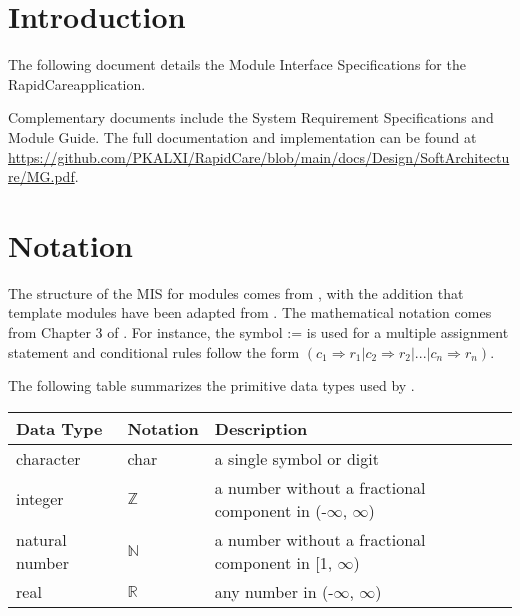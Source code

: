 \documentclass[12pt, titlepage]{article}
\newcommand{\projname}{RapidCare}
\begin{document}
\newpage

\tableofcontents

\newpage


\section{Introduction}

The following document details the Module Interface Specifications for the \projname application.

Complementary documents include the System Requirement Specifications and Module Guide. The full documentation and implementation can be found at \url{https://github.com/PKALXI/RapidCare/blob/main/docs/Design/SoftArchitecture/MG.pdf}.

\section{Notation}


The structure of the MIS for modules comes from \citet{HoffmanAndStrooper1995},
with the addition that template modules have been adapted from
\cite{GhezziEtAl2003}.  The mathematical notation comes from Chapter 3 of
\citet{HoffmanAndStrooper1995}.  For instance, the symbol := is used for a
multiple assignment statement and conditional rules follow the form $(c_1
\Rightarrow r_1 | c_2 \Rightarrow r_2 | ... | c_n \Rightarrow r_n )$.

The following table summarizes the primitive data types used by \progname. 

\begin{center}
\renewcommand{\arraystretch}{1.2}
\noindent 
\begin{tabular}{l l p{7.5cm}} 
\toprule 
\textbf{Data Type} & \textbf{Notation} & \textbf{Description}\\ 
\midrule
character & char & a single symbol or digit\\
integer & $\mathbb{Z}$ & a number without a fractional component in (-$\infty$, $\infty$) \\
natural number & $\mathbb{N}$ & a number without a fractional component in [1, $\infty$) \\
real & $\mathbb{R}$ & any number in (-$\infty$, $\infty$)\\
\bottomrule
\end{tabular} 
\end{center}
\end{document}

